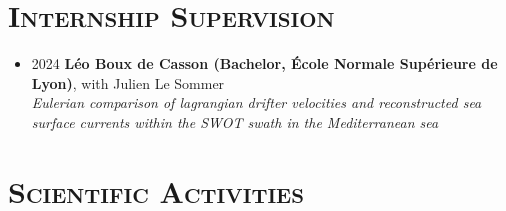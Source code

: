 \documentclass{article}
\begin{document}
\section*{\textsc{Internship Supervision}}
\begin{itemize}
    \item[] 2024 \tabto{2cm} \textbf{Léo Boux de Casson (Bachelor, École Normale Supérieure de Lyon)}, with Julien Le Sommer \\[.1 cm]
    \tabto{2cm} \textit{Eulerian comparison of lagrangian drifter velocities and reconstructed sea surface currents within the \tabto{2cm} SWOT swath in the Mediterranean sea}
\end{itemize}

\section*{\textsc{Scientific Activities}}
\end{document}
